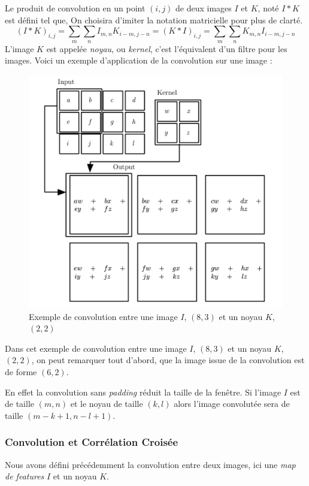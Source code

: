 \documentclass[a4paper, 10pt]{report}
\begin{document}
Le produit de convolution en un point $(i,j)$ de deux images $I$ et $K$, noté $I * K$ est défini tel que,
On choisira d'imiter la notation matricielle pour plus de clarté.
$$(I*K)_{i,j} = \sum_{m}\sum_{n}{I_{m,n}K_{i-m,j-n}} = (K*I)_{i,j} = \sum_{m}\sum_{n}{K_{m,n}I_{i-m,j-n}}$$
L'image $K$ est appelée \emph{noyau}, ou \emph{kernel}, c'est l'équivalent d'un filtre pour les images.
Voici un exemple d'application de la convolution sur une image :
\begin{figure}[H]
	\begin{center}
		\includegraphics[scale=0.25]{Images/Convolution.png}
		\caption{Exemple de convolution entre une image $I$, $(8,3)$ et un noyau $K$, $(2,2)$}
	\end{center}
\end{figure}
Dans cet exemple de convolution entre une image $I$, $(8,3)$ et un noyau $K$, $(2,2)$, on peut remarquer tout d'abord, que la image issue de la convolution est de forme $(6,2)$.

En effet la convolution sans \emph{padding} réduit la taille de la fenêtre.
Si l'image $I$ est de taille $(m,n)$ et le noyau de taille $(k,l)$ alors l'image convolutée sera de taille $(m-k+1,n-l+1)$.
\subsubsection{Convolution et Corrélation Croisée}
Nous avons défini précédemment la convolution entre deux images, ici une \emph{map de features} $I$ et un noyau $K$.
\end{document}
